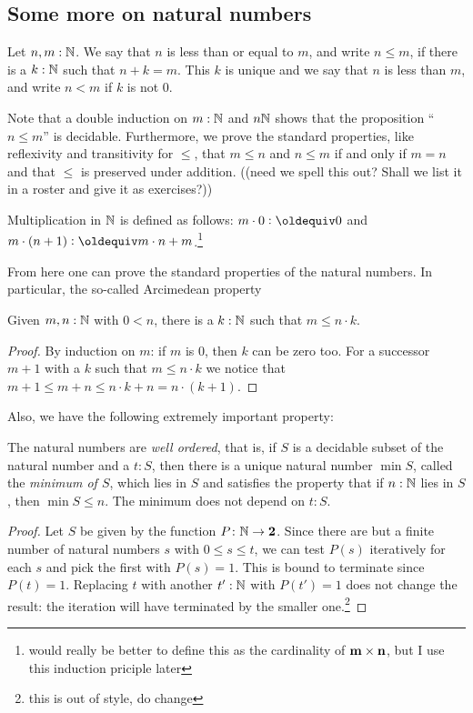 \begin{definition}
\subsection{Some more on natural numbers}
\label{sec:archmed}
\begin{definition}
  \label{def:orderonN}
  Let $n,m:\mathbb{N}$. We say that $n$ is less than or equal to $m$, and write $n\leq m$, if there is a $k:\mathbb{N}$ such that $n+k=m$. This $k$ is unique and we say that $n$ is less than $m$, and write $n<m$ if $k$ is not $0$. 
\end{definition}
Note that a double induction on $m:\mathbb{N}$ and $n\mathbb{N}$ shows that the proposition ``$n\leq m$'' is decidable.  Furthermore, we prove the standard properties, like reflexivity and transitivity for $\leq$, that $m\leq n$ and $n\leq m$ if and only if $m=n$ and that $\leq$ is preserved under addition. ((need we spell this out?  Shall we list it in a roster and give it as exercises?))
\begin{definition}
  \label{def:multiplicationinN}
  Multiplication in $\mathbb{N}$ is defined as follows: $m\cdot 0\defequi 0$ and $m\cdot(n+1)\defequi m\cdot n+m$.\footnote{would really be better to define this as the cardinality of $\mathbf{m}\times\mathbf{n}$, but I use this induction priciple later}
\end{definition}
From here one can prove the standard  properties of the natural numbers.  In particular, the so-called Arcimedean property 
\begin{lemma}
  \label{lem:archimed}
  Given $m,n:\mathbb{N}$ with $0<n$, there is a $k:\mathbb{N}$ such that $m\leq n\cdot k$.
\end{lemma}
\begin{proof}
  By induction on $m$: if $m$ is $0$, then $k$ can be zero too.  For a successor $m+1$ with a $k$ such that $m\leq n\cdot k$ we notice that $m+1\leq m+n\leq n\cdot k+n=n\cdot (k+1)$.
\end{proof}
Also, we have the following extremely important property:
\begin{lemma}
  \label{lem:Niswellordered}
  The natural numbers are \emph{well ordered}, that is, if $S$ is a decidable subset of the natural number and a $t:S$, then there is a unique natural number $\min S$, called the \emph{minimum of $S$}, which lies in $S$ and satisfies the property that if $n:\mathbb{N}$ lies in $S$, then $\min S\leq n$.  The minimum does not depend on $t:S$.
\end{lemma}
\begin{proof}
  Let $S$ be given by the function $P\colon\mathbb{N}\to\mathbf{2}$.  Since there are but a finite number of natural numbers $s$ with $0\leq s\leq t$, we can test $P(s)$ iteratively for each $s$ and pick the first with $P(s)=1$. This is bound to terminate since $P(t)=1$.  Replacing $t$ with another $t':\mathbb{N}$ with $P(t')=1$ does not change the result: the iteration will have terminated by the smaller one.\footnote{this is out of style, do change}
\end{proof}


\end{definition}
